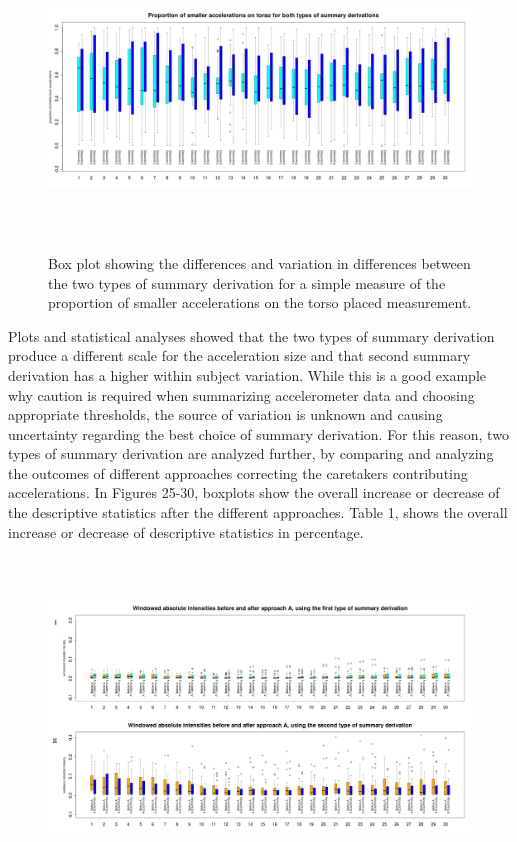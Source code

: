 \documentclass{article}
\begin{document}
{\begin{figure}[h!]
\includegraphics[width=15cm, height=8cm]{final_proportions_boxplot.png}
\caption{Box plot showing the differences and variation in differences between the two types of summary derivation for a simple measure of the proportion of smaller accelerations on the torso placed measurement.}
\end{figure}
\newpage
Plots and statistical analyses showed that the two types of summary derivation produce a different scale for the acceleration size and that second summary derivation has a higher within subject variation. While this is a good example why caution is required when summarizing accelerometer data and choosing appropriate thresholds, the source of variation is unknown and causing uncertainty regarding the best choice of summary derivation. For this reason, two types of summary derivation are analyzed further, by comparing and analyzing the outcomes of different approaches correcting the caretakers contributing accelerations. In Figures 25-30, boxplots show the overall increase or decrease of the descriptive statistics after the different approaches. Table 1, shows the overall increase or decrease of descriptive statistics in percentage.
\\
\begin{figure}[h!]
\includegraphics[width=15cm, height=8.5cm]{result_approach_A_AI_boxplot.png}

\end{figure}}
\end{document}
